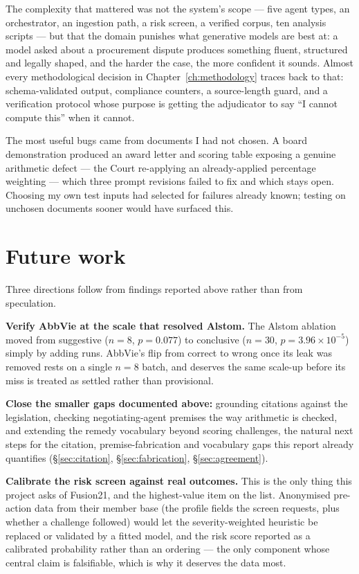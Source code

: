 The complexity that mattered was not the system's scope --- five agent
types, an orchestrator, an ingestion path, a risk screen, a verified
corpus, ten analysis scripts --- but that the domain punishes what
generative models are best at: a model asked about a procurement dispute
produces something fluent, structured and legally shaped, and the harder
the case, the more confident it sounds. Almost every methodological
decision in Chapter~\ref{ch:methodology} traces back to that:
schema-validated output, compliance counters, a source-length guard, and a
verification protocol whose purpose is getting the adjudicator to say ``I
cannot compute this'' when it cannot.

The most useful bugs came from documents I had not chosen. A board
demonstration produced an award letter and scoring table exposing a
genuine arithmetic defect --- the Court re-applying an already-applied
percentage weighting --- which three prompt revisions failed to fix and
which stays open. Choosing my own test inputs had selected for failures
already known; testing on unchosen documents sooner would have surfaced
this.

\section{Future work}
\label{sec:future}

Three directions follow from findings reported above rather than from
speculation.

\textbf{Verify AbbVie at the scale that resolved Alstom.} The Alstom
ablation moved from suggestive ($n=8$, $p=0.077$) to conclusive ($n=30$,
$p=3.96\times10^{-5}$) simply by adding runs. AbbVie's flip from correct to
wrong once its leak was removed rests on a single $n=8$ batch, and deserves
the same scale-up before its miss is treated as settled rather than
provisional.

\textbf{Close the smaller gaps documented above:} grounding citations
against the legislation, checking negotiating-agent premises the way
arithmetic is checked, and extending the remedy vocabulary beyond scoring
challenges, the natural next steps for the citation, premise-fabrication
and vocabulary gaps this report already quantifies (\S\ref{sec:citation},
\S\ref{sec:fabrication}, \S\ref{sec:agreement}).

\textbf{Calibrate the risk screen against real outcomes.} This is the only
thing this project asks of Fusion21, and the highest-value item on the
list. Anonymised pre-action data from their member base (the profile
fields the screen requests, plus whether a challenge followed) would let
the severity-weighted heuristic be replaced or validated by a fitted
model, and the risk score reported as a calibrated probability rather than
an ordering --- the only component whose central claim is falsifiable,
which is why it deserves the data most.

